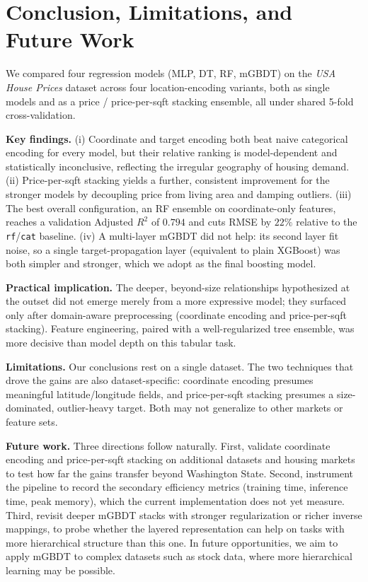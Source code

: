 \section{Conclusion, Limitations, and Future Work}

We compared four regression models (MLP, DT, RF, mGBDT) on the \textit{USA House
Prices} dataset across four location-encoding variants, both as single models and as
a price / price-per-sqft stacking ensemble, all under shared 5-fold cross-validation.

\textbf{Key findings.}
(i) Coordinate and target encoding both beat naive categorical encoding for every
model, but their relative ranking is model-dependent and statistically inconclusive,
reflecting the irregular geography of housing demand.
(ii) Price-per-sqft stacking yields a further, consistent improvement for the stronger
models by decoupling price from living area and damping outliers.
(iii) The best overall configuration, an RF ensemble on coordinate-only features,
reaches a validation Adjusted $R^2$ of $0.794$ and cuts RMSE by $22\%$ relative to the
\texttt{rf}/\texttt{cat} baseline.
(iv) A multi-layer mGBDT did not help: its second layer fit noise, so a single
target-propagation layer (equivalent to plain XGBoost) was both simpler and stronger,
which we adopt as the final boosting model.

\textbf{Practical implication.}
The deeper, beyond-size relationships hypothesized at the outset did not emerge merely
from a more expressive model; they surfaced only after domain-aware preprocessing
(coordinate encoding and price-per-sqft stacking). Feature engineering, paired with a
well-regularized tree ensemble, was more decisive than model depth on this tabular task.

\textbf{Limitations.}
Our conclusions rest on a single dataset. The two techniques that drove the gains are
also dataset-specific: coordinate encoding presumes meaningful latitude/longitude
fields, and price-per-sqft stacking presumes a size-dominated, outlier-heavy target.
Both may not generalize to other markets or feature sets.

\textbf{Future work.}
Three directions follow naturally. First, validate coordinate encoding and
price-per-sqft stacking on additional datasets and housing markets to test how far the
gains transfer beyond Washington State. Second, instrument the pipeline to record the
secondary efficiency metrics (training time, inference time, peak memory), which the
current implementation does not yet measure. Third, revisit deeper mGBDT stacks with
stronger regularization or richer inverse mappings, to probe whether the layered
representation can help on tasks with more hierarchical structure than this one.
In future opportunities, we aim to apply mGBDT to complex datasets such as stock data, where more hierarchical learning may be possible.
